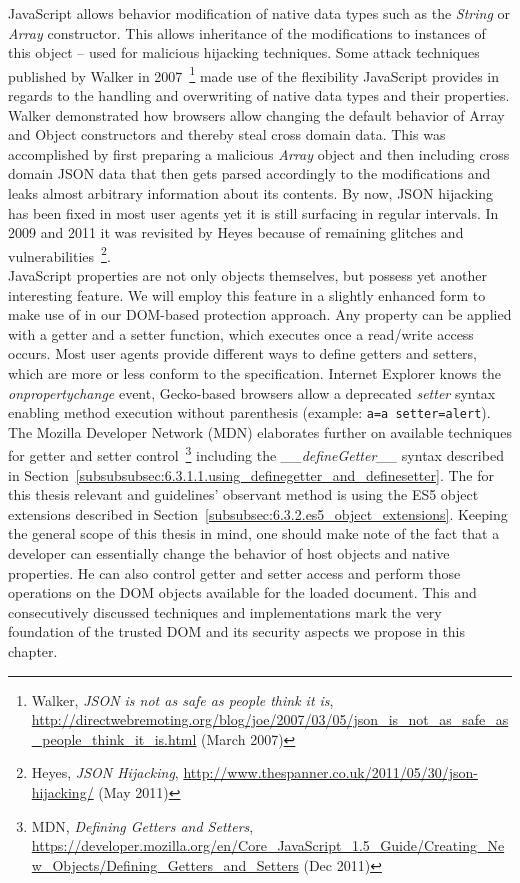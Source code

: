     JavaScript allows behavior modification of native data types such as the \textit{String} or \textit{Array} constructor. This allows inheritance of the modifications to instances of this object -- used for malicious hijacking techniques. Some attack techniques published by Walker in 2007~\footnote{Walker, \textit{JSON is not as safe as people think it is}, \url{http://directwebremoting.org/blog/joe/2007/03/05/json_is_not_as_safe_as_people_think_it_is.html} (March 2007)} made use of the flexibility JavaScript provides in regards to the handling and overwriting of native data types and their properties. Walker demonstrated how browsers allow changing the default behavior of Array and Object constructors and thereby steal cross domain data. This was accomplished by first preparing a malicious \textit{Array} object and then including cross domain JSON data that then gets parsed accordingly to the modifications and leaks almost arbitrary information about its contents. By now, JSON hijacking has been fixed in most user agents yet it is still surfacing in regular intervals. In 2009 and 2011 it was revisited by Heyes because of remaining glitches and vulnerabilities~\footnote{Heyes, \textit{JSON Hijacking}, \url{http://www.thespanner.co.uk/2011/05/30/json-hijacking/} (May 2011)}.\\

    JavaScript properties are not only objects themselves, but possess yet another interesting feature. We will employ this feature in a slightly enhanced form to make use of in our DOM-based protection approach. Any property can be applied with a getter and a setter function, which executes once a read/write access occurs. Most user agents provide different ways to define getters and setters, which are more or less conform to the specification. Internet Explorer knows the \textit{onpropertychange} event, Gecko-based browsers allow a deprecated \textit{setter} syntax enabling method execution without parenthesis (example: \texttt{a=a setter=alert}). The Mozilla Developer Network (MDN) elaborates further on available techniques for getter and setter control~\footnote{MDN, \textit{Defining Getters and Setters}, \url{https://developer.mozilla.org/en/Core_JavaScript_1.5_Guide/Creating_New_Objects/Defining_Getters_and_Setters} (Dec 2011)} including the \textit{\_\_defineGetter\_\_} syntax described in Section~\ref{subsubsubsec:6.3.1.1.using_definegetter_and_definesetter}. The for this thesis relevant and guidelines' observant method is using the ES5 object extensions described in Section~\ref{subsubsec:6.3.2.es5_object_extensions}. Keeping the general scope of this thesis in mind, one should make note of the fact that a developer can essentially change the behavior of host objects and native properties. He can also control getter and setter access and perform those operations on the DOM objects available for the loaded document. This and consecutively discussed techniques and implementations mark the very foundation of the trusted DOM and its security aspects we propose in this chapter.

